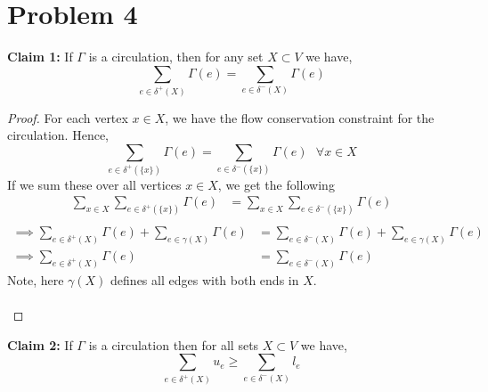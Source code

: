 \documentclass{article}
\begin{document}
    \section{Problem 4}
    \textbf{Claim 1:} If $\Gamma$ is a circulation, then for any set $X\subset V$ we have, 
    \begin{equation*}
        \sum_{e \in \delta^+(X)} \Gamma(e) = \sum_{e \in \delta^-(X)} \Gamma(e)
    \end{equation*}
    \begin{proof}
        For each vertex $x\in X$, we have the flow conservation constraint for the circulation. Hence, 
        \begin{equation*}
            \sum_{e \in \delta^+(\{x\})} \Gamma(e) = \sum_{e \in \delta^-(\{x\})} \Gamma(e) \, \, \, \, \forall x \in X
        \end{equation*}
        If we sum these over all vertices $x \in X$, we get the following 
        \begin{equation*}
            \begin{split}
                \sum_{x \in X}\sum_{e \in \delta^+(\{x\})} \Gamma(e) &= \sum_{x \in X}\sum_{e \in \delta^-(\{x\})} \Gamma(e)\\
            \end{split}
        \end{equation*}
        \begin{equation*}
            \begin{split}
                \implies \sum_{e \in \delta^+(X)} \Gamma(e) + \sum_{e \in \gamma (X)} \Gamma(e) &= \sum_{e \in \delta^-(X)} \Gamma(e) + \sum_{e \in \gamma (X)} \Gamma(e)\\
                \implies \sum_{e \in \delta^+(X)} \Gamma(e) &= \sum_{e \in \delta^-(X)} \Gamma(e)
            \end{split}
        \end{equation*}
        Note, here $\gamma(X)$ defines all edges with both ends in $X$. \\\\
        \end{proof}
        \noindent \textbf{Claim 2:} If $\Gamma$ is a circulation then for all sets $X\subset V$ we have, 
        \begin{equation*}
            \sum_{e \in \delta^+(X)} u_e \ge \sum_{e \in \delta^-(X)} l_e 
        \end{equation*}
\end{document}
